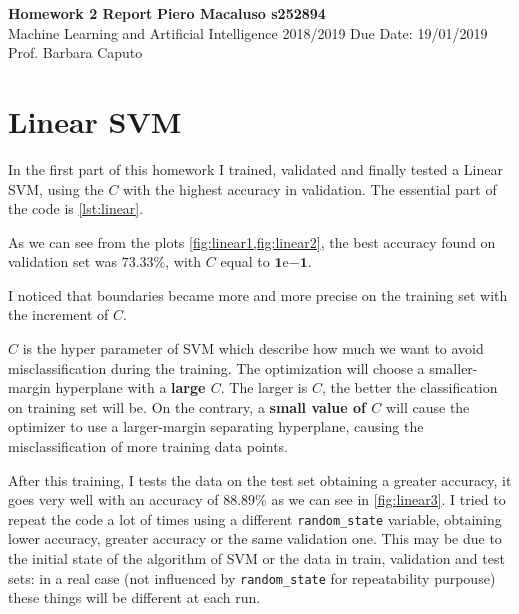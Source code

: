 \documentclass[a4paper, 11pt]{article}
\begin{document}
	\noindent
	\large\textbf{Homework 2 Report} \hfill \textbf{Piero Macaluso s252894} \\
	\normalsize Machine Learning and Artificial Intelligence 2018/2019 \hfill Due Date: 19/01/2019 \\
	Prof. Barbara Caputo  
	
	\section{Linear SVM}
	
	In the first part of this homework I trained, validated and finally tested a Linear SVM, using the $C$ with the highest accuracy in validation. The essential part of the code is \vref{lst:linear}.
	
	
%	
%	
	
	As we can see from the plots \vref{fig:linear1,fig:linear2}, the best accuracy found on validation set was $\boldsymbol{73.33\%}$, with $C$ equal to  $\boldsymbol{1\mathrm{e}{-1}}$.
	
	I noticed that boundaries became more and more precise on the training set with the increment of $C$. 
	
	$C$ is the hyper parameter of SVM which describe how much we want to avoid misclassification during the training.
	The optimization will choose a smaller-margin hyperplane with a \textbf{large $C$}.
	The larger is $C$, the better the classification on training set will be. On the contrary, a \textbf{small value of $C$} will cause the optimizer to use a larger-margin separating hyperplane, causing the misclassification of more training data points.
	
	After this training, I tests the data on the test set obtaining a greater accuracy, it goes very well with an accuracy of $\boldsymbol{88.89\%}$ as we can see in \vref{fig:linear3}.  I tried to repeat the code a lot of times using a different \texttt{random\_state} variable, obtaining lower accuracy, greater accuracy or the same validation one. This may be due to the initial state of the algorithm of SVM or the data in train, validation and test sets: in a real case (not influenced by \texttt{random\_state} for repeatability purpouse) these things will be different at each run.
\end{document}
